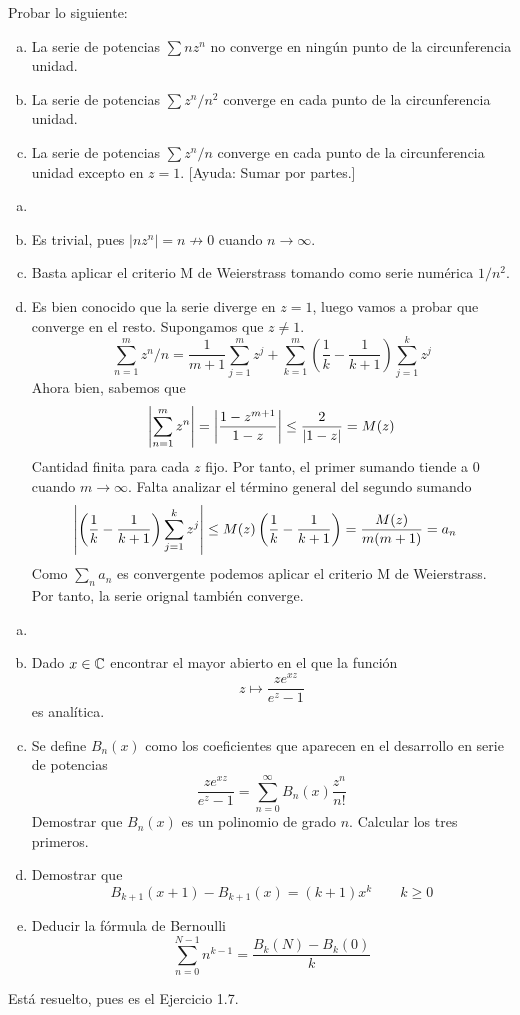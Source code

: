 \documentclass[twoside]{article}
\begin{document}
\begin{ejercicio}{3}
Probar lo siguiente:
\begin{enumerate}[(a)]
\item La serie de potencias $\sum nz^n$ no converge en ningún punto de la circunferencia unidad. 
\item La serie de potencias $\sum z^n/n^2$ converge en cada punto de la circunferencia unidad.
\item La serie de potencias $\sum z^n/n$ converge en cada punto de la circunferencia unidad excepto en $z=1$. [Ayuda: Sumar por partes.]
\end{enumerate}
\end{ejercicio}
\begin{solucion}
\begin{enumerate}[(a)]
\item[]
\item Es trivial, pues $|nz^n| =n \not\to 0 $ cuando $n\to \infty$.
\item Basta aplicar el criterio M de Weierstrass tomando como serie numérica $1/n^2$.
\item Es bien conocido que la serie diverge en $z=1$, luego vamos a probar que converge en el resto. Supongamos que $z\neq 1$. 
$$
\sum_{n=1}^m z^n/n = \frac{1}{m+1}\sum_{j=1}^m z^j + \sum_{k=1}^m  \left(\frac{1}{k}-\frac{1}{k+1}\right)  \sum_{j=1}^k z^j 
$$
Ahora bien, sabemos que
$$
\left\lvert\sum_{n=1}^m z^n \right\rvert = \left\lvert\frac{1-z^{m+1}}{1-z}\right\rvert\leq \frac{2}{\left\lvert1-z\right\rvert} = M(z)
$$
Cantidad finita para cada $z$ fijo. Por tanto, el primer sumando tiende a $0$ cuando $m\to \infty$. Falta analizar el término general del segundo sumando
\begin{align*}
\left\lvert\left(\frac{1}{k}-\frac{1}{k+1}\right) \sum_{j=1}^k z^j \right\rvert & \leq M(z) \left(\frac{1}{k}-\frac{1}{k+1}\right) = \frac{M(z)}{m(m+1)}=a_n
\end{align*} 
Como $\sum_n a_n$ es convergente podemos aplicar el criterio M de Weierstrass. Por tanto, la serie orignal también converge.
\end{enumerate}
\end{solucion}
\newpage

\begin{ejercicio}{4}
\begin{enumerate}[(a)]
\item[]
\item Dado $x\in \mathbb{C}$ encontrar el mayor abierto en el que la función
$$
z\mapsto \frac{ze^{xz}}{e^z-1}
$$
es analítica.
\item Se define $B_n(x)$ como los coeficientes que aparecen en el desarrollo en serie de potencias
$$
\frac{ze^{xz}}{e^z-1}= \sum_{n=0}^\infty B_n(x)\frac{z^n}{n!}
$$
Demostrar que $B_n(x)$ es un polinomio de grado $n$. Calcular los tres primeros.
\item Demostrar que 
$$
B_{k+1}(x+1)-B_{k+1}(x)=(k+1)x^k\qquad k\geq 0
$$
\item Deducir la fórmula de Bernoulli
$$
\sum_{n=0}^{N-1} n^{k-1} = \frac{B_k(N)-B_k(0)}{k}
$$
\end{enumerate}
\end{ejercicio}
\begin{solucion}
Está resuelto, pues es el Ejercicio 1.7.
\end{solucion}
\end{document}
